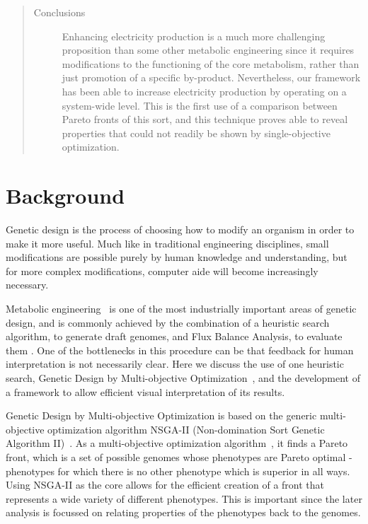 \documentclass[a4paper]{article}
\begin{document}
\begin{abstract}
\begin{description}
\item[Conclusions]
Enhancing electricity production is a much more challenging proposition than some other metabolic engineering since it requires modifications to the functioning of the core metabolism, rather than just promotion of a specific by-product. Nevertheless, our framework has been able to increase electricity production by operating on a system-wide level. This is the first use of a comparison between Pareto fronts of this sort, and this technique proves able to reveal properties that could not readily be shown by single-objective optimization.

\end{description}
\end{abstract}

\section{Background}

Genetic design is the process of choosing how to modify an organism in order to make it more useful. Much like in traditional engineering disciplines, small modifications are possible purely by human knowledge and understanding, but for more complex modifications, computer aide will become increasingly necessary.

Metabolic engineering~\cite{stephanopoulos1999metabolic} is one of the most industrially important areas of genetic design, and is commonly achieved by the combination of a heuristic search algorithm, to generate draft genomes, and Flux Balance Analysis, to evaluate them \cite{Orth2010}. One of the bottlenecks in this procedure can be that feedback for human interpretation is not necessarily clear. Here we discuss the use of one heuristic search, Genetic Design by Multi-objective Optimization~\cite{Costanza2012}, and the development of a framework to allow efficient visual interpretation of its results.

Genetic Design by Multi-objective Optimization is based on the generic multi-objective optimization algorithm NSGA-II (Non-domination Sort Genetic Algorithm II)~\cite{Deb2002a}. As a multi-objective optimization  algorithm~\cite{Gen2008}, it finds a Pareto front, which is a set of possible genomes whose phenotypes are Pareto optimal - phenotypes for which there is no other phenotype which is superior in all ways. Using NSGA-II as the core allows for the efficient creation of a front that represents a wide variety of different phenotypes. This is important since the later analysis is focussed on relating properties of the phenotypes back to the genomes.
\end{document}
